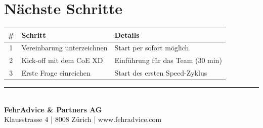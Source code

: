 \documentclass[11pt,a4paper]{article}
\newcommand{\fahead}[1]{\textcolor{fawhite}{\bfseries #1}}
\begin{document}
\vspace{1cm}

\section{Nächste Schritte}

\begin{center}
\begin{tabular}{clp{8cm}}
\toprule
\rowcolor{fadarkblue}
\fahead{\#} & \fahead{Schritt} & \fahead{Details} \\
\midrule
\rowcolor{fawhite}
1 & Vereinbarung unterzeichnen & Start per sofort möglich \\
\rowcolor{falightgray}
2 & Kick-off mit dem CoE XD & Einführung für das Team (30 min) \\
\rowcolor{fawhite}
3 & Erste Frage einreichen & Start des ersten Speed-Zyklus \\
\bottomrule
\end{tabular}
\end{center}

\vfill

\begin{center}
\textcolor{fadarkblue}{\rule{0.8\textwidth}{1pt}}\\[0.5cm]
\textbf{FehrAdvice \& Partners AG}\\
Klausstrasse 4 | 8008 Zürich | www.fehradvice.com
\end{center}
\end{document}

